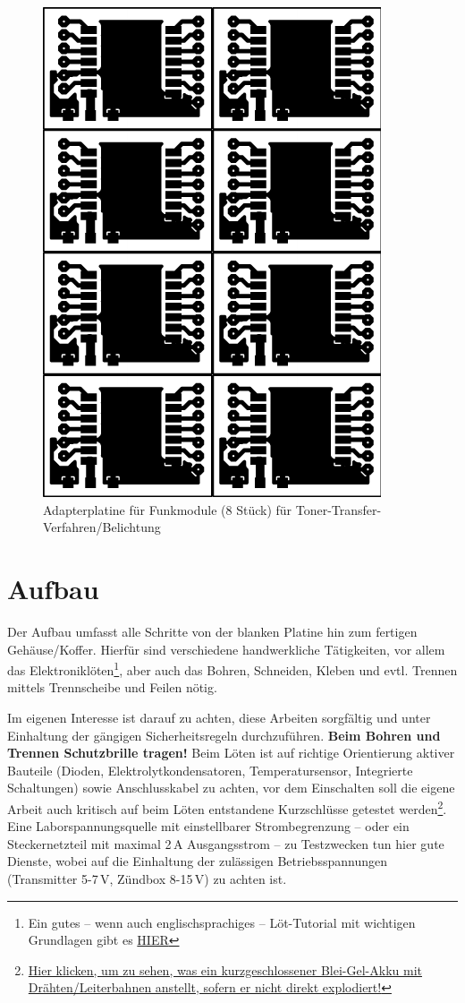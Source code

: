 \documentclass[pdftex, parskip, numbers=noenddot, toc=listof]{scrbook}
\begin{document}
	\begin{figure}
		\centering
		\includegraphics[scale=1]{Bilder/rfm-dil-70x100}
		\caption{Adapterplatine für Funkmodule (8 Stück) für Toner-Transfer-Verfahren/Belichtung}
		\label{fig:rfmprint}
	\end{figure}



	\chapter{Aufbau}

	Der Aufbau umfasst alle Schritte von der blanken Platine hin zum fertigen Gehäuse/Koffer. Hierfür sind verschiedene handwerkliche Tätigkeiten, vor allem das Elektroniklöten\footnote{Ein gutes -- wenn auch englischsprachiges -- Löt-Tutorial mit wichtigen Grundlagen gibt es \href{https://www.youtube.com/watch?v=I_NU2ruzyc4}{HIER}}, aber auch das Bohren, Schneiden, Kleben und evtl. Trennen mittels Trennscheibe und Feilen nötig.

	Im eigenen Interesse ist darauf zu achten, diese Arbeiten sorgfältig und unter Einhaltung der gängigen Sicherheitsregeln durchzuführen. \textbf{Beim Bohren und Trennen Schutzbrille tragen!} Beim Löten ist auf richtige Orientierung aktiver Bauteile (Dioden, Elektrolytkondensatoren, Temperatursensor, Integrierte Schaltungen) sowie Anschlusskabel zu achten, vor dem Einschalten soll die eigene Arbeit auch kritisch auf beim Löten entstandene Kurzschlüsse getestet werden\footnote{\href{http://www.youtube.com/watch?v=79dauuviLe4}{Hier klicken, um zu sehen, was ein kurzgeschlossener Blei-Gel-Akku mit Drähten/Leiterbahnen anstellt, sofern er nicht direkt explodiert!}}. Eine Laborspannungsquelle mit einstellbarer Strombegrenzung -- oder ein Steckernetzteil mit maximal 2\,A Ausgangsstrom -- zu Testzwecken tun hier gute Dienste, wobei auf die Einhaltung der zulässigen Betriebsspannungen (Transmitter 5-7\,V, Zündbox 8-15\,V) zu achten ist.
\end{document}
